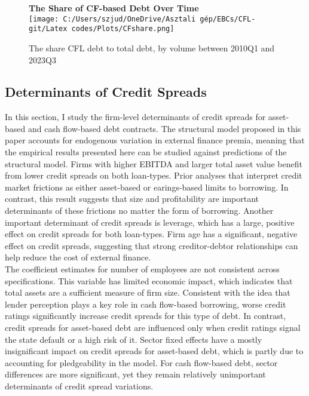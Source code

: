 \documentclass[12pt]{article}
\begin{document}
\begin{figure}[H]  %
    \centering
    \textbf{\large The Share of CF-based Debt Over Time \vspace{2mm}} \\  %
    \label{chart:CFLshare}
    \texttt{[image: C:/Users/szjud/OneDrive/Asztali gép/EBCs/CFL-git/Latex codes/Plots/CFshare.png]} \\
     \caption{\small The share CFL debt to total debt, by volume between 2010Q1 and 2023Q3}
\end{figure}

\subsection{Determinants of Credit Spreads \label{sec:credit spreads}} 
In this section, I study the firm-level determinants of credit spreads for asset-based and cash flow-based debt contracts. The structural model proposed in this paper accounts for endogenous variation in external finance premia, meaning that the empirical results presented here can be studied against predictions of the structural model. Firms with higher EBITDA and larger total asset value benefit from lower credit spreads on both loan-types. Prior analyses that interpret credit market frictions as either asset-based or earings-based limits to borrowing. In contrast, this result suggests that size and profitability are important determinants of these frictions no matter the form of borrowing. Another important determinant of credit spreads is leverage, which has a large, positive effect on credit spreads for both loan-types. Firm age has a significant, negative effect on credit spreads, suggesting that strong creditor-debtor relationships can help reduce the cost of external finance. \vspace{3mm} \\
The coefficient estimates for number of employees are not consistent across specifications. This variable has limited economic impact, which indicates that total assets are a sufficient measure of firm size. Consistent with the idea that lender perception plays a key role in cash flow-based borrowing, worse credit ratings significantly increase credit spreads for this type of debt. In contrast, credit spreads for asset-based debt are influenced only when credit ratings signal the state default or a high risk of it. Sector fixed effects have a mostly insignificant impact on credit spreads for asset-based debt, which is partly due to accounting for pledgeability in the model. For cash flow-based debt, sector differences are more significant, yet they remain relatively unimportant determinants of credit spread variations. \vspace{3mm} \\
\end{document}
